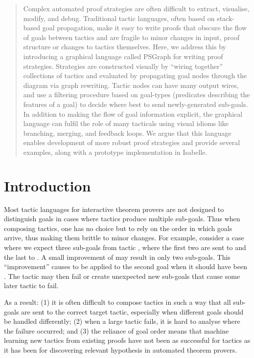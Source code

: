 \documentclass{llncs}
\begin{document}
\begin{abstract}
Complex automated proof strategies are often difficult to extract, visualise, modify, and debug. 
Traditional tactic languages, often based on stack-based goal propagation, make it easy to write proofs that obscure the flow of goals between tactics and are fragile to minor changes in input, proof structure or changes to tactics themselves. Here, we address this by introducing a graphical language called PSGraph for writing proof strategies. Strategies are constructed visually by ``wiring together'' collections of tactics and evaluated by propagating goal nodes through the diagram via graph rewriting. Tactic nodes can have many output wires, and use a filtering procedure based on goal-types (predicates describing the features of a goal) to decide where best to send newly-generated sub-goals. 
In addition to making the flow of goal information explicit, the graphical language can fulfil the role of many tacticals using visual idioms like branching, merging, and feedback loops. We argue that this language enables development of more robust proof strategies and provide several examples, along with a prototype implementation in Isabelle.
\end{abstract}

\vspace{-0.6em}
\beforesection
\section{Introduction}\label{sec:intro}
\aftersection

Most tactic languages for interactive theorem provers are not designed to distinguish goals in cases where tactics
produce multiple sub-goals. Thus when composing tactics, one  has no choice but to rely on the order in which goals
arrive, thus making them brittle to minor changes.  For example, consider a case where we expect three sub-goals from
tactic , where the first two are sent to  and the last to . A small improvement of  may result in
only two sub-goals. This ``improvement'' causes  to be applied to the second goal when it should have been .
The tactic  may then fail or create unexpected new sub-goals that cause some later tactic to fail.

As a result: (1) it is often difficult to compose tactics in such a way that all sub-goals are sent to the correct
target tactic, especially when different goals should be handled differently; (2) when a large tactic fails, it is hard
to analyse where the failure occurred; and (3) the reliance of goal order means that machine learning new tactics from existing
proofs have not been as successful for tactics as it has been for discovering relevant hypothesis in automated theorem
provers.
\end{document}
